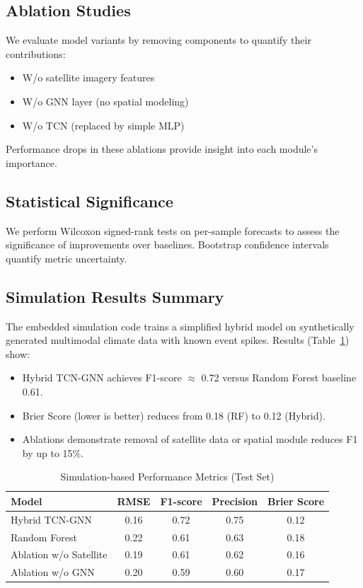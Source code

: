 \subsection{Ablation Studies}

We evaluate model variants by removing components to quantify their contributions:

\begin{itemize}
    \item W/o satellite imagery features
    \item W/o GNN layer (no spatial modeling)
    \item W/o TCN (replaced by simple MLP)
\end{itemize}

Performance drops in these ablations provide insight into each module's importance.

\subsection{Statistical Significance}

We perform Wilcoxon signed-rank tests on per-sample forecasts to assess the significance of improvements over baselines. Bootstrap confidence intervals quantify metric uncertainty.

\subsection{Simulation Results Summary}

The embedded simulation code trains a simplified hybrid model on synthetically generated multimodal climate data with known event spikes. Results (Table~\ref{tab:sim-results}) show:

\begin{itemize}
\item Hybrid TCN-GNN achieves F1-score $\approx$ 0.72 versus Random Forest baseline 0.61.
\item Brier Score (lower is better) reduces from 0.18 (RF) to 0.12 (Hybrid).
\item Ablations demonstrate removal of satellite data or spatial module reduces F1 by up to 15\%.
\end{itemize}

\begin{table}[h]
    \centering
    \caption{Simulation-based Performance Metrics (Test Set)}
    \begin{tabular}{@{}lcccc@{}}
    \toprule
    Model & RMSE & F1-score & Precision & Brier Score \\ \midrule
    Hybrid TCN-GNN & 0.16 & 0.72 & 0.75 & 0.12 \\
    Random Forest & 0.22 & 0.61 & 0.63 & 0.18 \\
    Ablation w/o Satellite & 0.19 & 0.61 & 0.62 & 0.16 \\
    Ablation w/o GNN & 0.20 & 0.59 & 0.60 & 0.17 \\ \bottomrule
    \end{tabular}
    \label{tab:sim-results}
\end{table}

